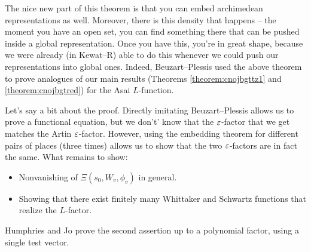 \documentclass[reqno]{amsart} 
\begin{document}
The nice new part of this theorem is that you can embed archimedean representations as well.  Moreover, there is this density that happens -- the moment you have an open set, you can find something there that can be pushed inside a global representation.  Once you have this, you're in great shape, because we were already (in Kewat--R) able to do this whenever we could push our representations into global ones.  Indeed, Beuzart--Plessis used the above theorem to prove analogues of our main results (Theorems \ref{theorem:cnojbgttz1} and \ref{theorem:cnojbgtred}) for the Asai $L$-function.

Let's say a bit about the proof.  Directly imitating Beuzart--Plessis allows us to prove a functional equation, but we don't' know that the $\varepsilon$-factor that we get matches the Artin $\varepsilon$-factor.  However, using the embedding theorem for different pairs of places (three times) allows us to show that the two $\varepsilon$-factors are in fact the same.  What remains to show:
\begin{itemize}
\item Nonvanishing of $\Xi(s_0, W_v, \phi_v)$ in general.
\item Showing that there exist finitely many Whittaker and Schwartz functions that realize the $L$-factor.
\end{itemize}
Humphries and Jo \cite{2021arXiv2112.06860} prove the second assertion up to a polynomial factor, using a single test vector.

{} 
\end{document}
